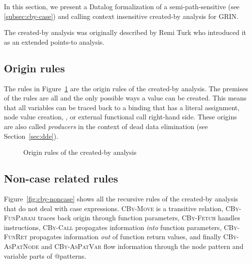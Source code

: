 \documentclass[main.tex]{subfiles}
\begin{document}
  In this section, we present a Datalog formalization of a semi-path-sensitive (see \ref{subsec:cby-case}) and calling context insensitive created-by analysis for GRIN.
  
  The created-by analysis was originally described by Remi Turk \cite{remi-masters} who introduced it as an extended points-to analysis. 
  
  \subsection{Origin rules}
  
  The rules in Figure~\ref{fig:cby-origins} are the origin rules of the created-by analysis. The premises of the rules are all and the only possible ways a value can be created. This means that all variables can be traced back to a binding that has a literal assignment, node value creation, ,  or external functional call right-hand side. These origins are also called \emph{producers} in the context of dead data elimination (see Section~\ref{sec:dde}).

  \begin{figure}[h]
  \caption{Origin rules of the created-by analysis}
  \label{fig:cby-origins}
  \end{figure}

	\subsection{Non-case related rules}
	
	Figure~\ref{fig:cby-noncase} shows all the recursive rules of the created-by analysis that do not deal with case expressions. \textsc{CBy-Move} is a transitive relation, \textsc{CBy-FunParam} traces back origin through function parameters, \textsc{CBy-Fetch} handles  instructions, \textsc{CBy-Call} propagates information \emph{into} function parameters, \textsc{CBy-FunRet} propagates information \emph{out} of function return values, and finally \textsc{CBy-AsPatNode} and \textsc{CBy-AsPatVar} flow information through the node pattern and variable parts of @patterns. 
\end{document}

